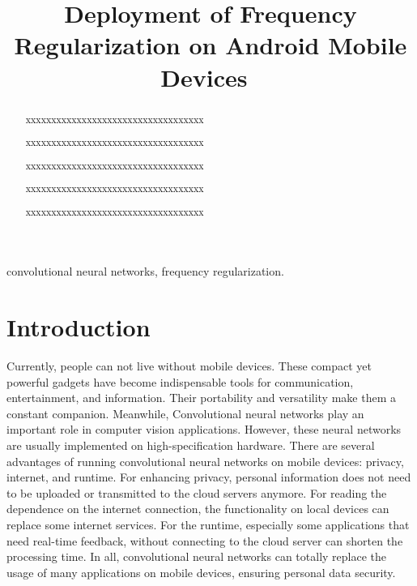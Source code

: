\documentclass[conference]{IEEEtran}
\begin{document}
\title{Deployment of Frequency Regularization on Android Mobile Devices\
}

\author{
	\and
}

\maketitle

\begin{abstract}
	
xxxxxxxxxxxxxxxxxxxxxxxxxxxxxxxxxxx

xxxxxxxxxxxxxxxxxxxxxxxxxxxxxxxxxxx

xxxxxxxxxxxxxxxxxxxxxxxxxxxxxxxxxxx

xxxxxxxxxxxxxxxxxxxxxxxxxxxxxxxxxxx

xxxxxxxxxxxxxxxxxxxxxxxxxxxxxxxxxxx

\end{abstract}

\begin{IEEEkeywords}
	
convolutional neural networks, frequency regularization.

\end{IEEEkeywords}

\section{Introduction}

Currently, people can not live without mobile devices. These compact yet powerful gadgets have become indispensable tools for communication, entertainment, and information. Their portability and versatility make them a constant companion. Meanwhile, Convolutional neural networks play an important role in computer vision applications. However, these neural networks are usually implemented on high-specification hardware. There are several advantages of running convolutional neural networks on mobile devices: privacy, internet, and runtime. For enhancing privacy, personal information does not need to be uploaded or transmitted to the cloud servers anymore. For reading the dependence on the internet connection, the functionality on local devices can replace some internet services. For the runtime, especially some applications that need real-time feedback, without connecting to the cloud server can shorten the processing time. In all, convolutional neural networks can totally replace the usage of many applications on mobile devices, ensuring personal data security. 
\end{document}
